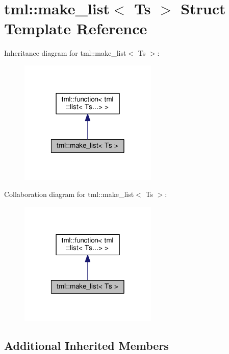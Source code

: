 \hypertarget{structtml_1_1make__list}{\section{tml\+:\+:make\+\_\+list$<$ Ts $>$ Struct Template Reference}
\label{structtml_1_1make__list}
}


Inheritance diagram for tml\+:\+:make\+\_\+list$<$ Ts $>$\+:
\nopagebreak
\begin{figure}[H]
\begin{center}
\leavevmode
\includegraphics[width=186pt]{structtml_1_1make__list__inherit__graph}
\end{center}
\end{figure}


Collaboration diagram for tml\+:\+:make\+\_\+list$<$ Ts $>$\+:
\nopagebreak
\begin{figure}[H]
\begin{center}
\leavevmode
\includegraphics[width=186pt]{structtml_1_1make__list__coll__graph}
\end{center}
\end{figure}
\subsection*{Additional Inherited Members}



